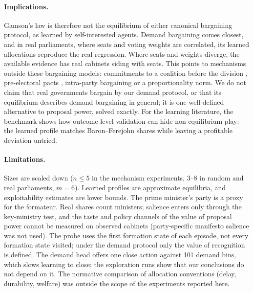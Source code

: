 \documentclass[11pt,a4paper]{article}
\begin{document}
\paragraph{Implications.} Gamson's law is therefore not the equilibrium of either canonical bargaining
protocol, as learned by self-interested agents. Demand bargaining comes closest, and in real parliaments,
where seats and voting weights are correlated, its learned allocations reproduce the real regression.
Where seats and weights diverge, the available evidence has real cabinets siding with seats. This points to mechanisms outside these
bargaining models: commitments to a coalition before the division \citep{kamm2024}, pre-electoral pacts
\citep{carroll2007}, intra-party bargaining \citep{cox2021} or a proportionality norm. We do not claim that real governments bargain by our demand protocol, or that its equilibrium describes
demand bargaining in general; it is one well-defined alternative to proposal power, solved exactly. For the
learning literature, the benchmark shows how outcome-level validation can hide non-equilibrium play: the
learned profile matches Baron--Ferejohn shares while leaving a profitable deviation untried.

\paragraph{Limitations.} Sizes are scaled down ($n\le5$ in the mechanism experiments, 3--8 in random and
real parliaments, $m=6$). Learned profiles are approximate equilibria, and exploitability estimates are
lower bounds. The prime minister's party is a proxy for the formateur. Real shares count ministers;
salience enters only through the key-ministry test, and the taste and policy channels of the value of
proposal power cannot be measured on observed cabinets (party-specific manifesto salience was not used). The
probe uses the first formation state of each episode, not every formation state visited; under the demand
protocol only the value of recognition is defined. The demand head offers one close action against 101 demand
bins, which slows learning to close; the exploration runs show that our conclusions do not depend on it.
The normative comparison of allocation conventions (delay, durability, welfare) was outside the scope of
the experiments reported here.

\end{document}

